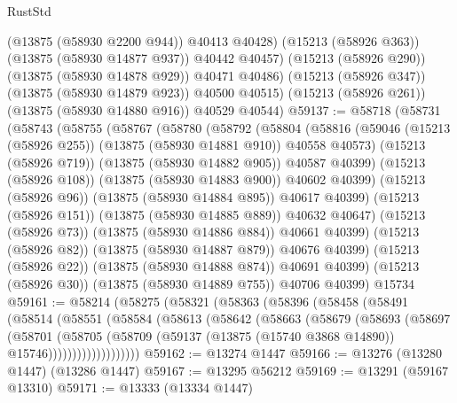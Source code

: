 \begin{lexlean}{RustStd}
\begin{coremodule}
              (@13875 (@58930 @2200 @944))
              @40413
              @40428)
            (@15213 (@58926 @363))
            (@13875 (@58930 @14877 @937))
            @40442
            @40457)
          (@15213 (@58926 @290))
          (@13875 (@58930 @14878 @929))
          @40471
          @40486)
        (@15213 (@58926 @347))
        (@13875 (@58930 @14879 @923))
        @40500
        @40515)
      (@15213 (@58926 @261))
      (@13875 (@58930 @14880 @916))
      @40529
      @40544)
@59137 := @58718
    (@58731
      (@58743
        (@58755
          (@58767
            (@58780
              (@58792
                (@58804
                  (@58816
                    (@59046 (@15213 (@58926 @255)) (@13875 (@58930 @14881 @910)) @40558 @40573)
                    (@15213 (@58926 @719))
                    (@13875 (@58930 @14882 @905))
                    @40587
                    @40399)
                  (@15213 (@58926 @108))
                  (@13875 (@58930 @14883 @900))
                  @40602
                  @40399)
                (@15213 (@58926 @96))
                (@13875 (@58930 @14884 @895))
                @40617
                @40399)
              (@15213 (@58926 @151))
              (@13875 (@58930 @14885 @889))
              @40632
              @40647)
            (@15213 (@58926 @73))
            (@13875 (@58930 @14886 @884))
            @40661
            @40399)
          (@15213 (@58926 @82))
          (@13875 (@58930 @14887 @879))
          @40676
          @40399)
        (@15213 (@58926 @22))
        (@13875 (@58930 @14888 @874))
        @40691
        @40399)
      (@15213 (@58926 @30))
      (@13875 (@58930 @14889 @755))
      @40706
      @40399)
    @15734
@59161 := @58214
    (@58275
      (@58321
        (@58363
          (@58396
            (@58458
              (@58491
                (@58514
                  (@58551
                    (@58584
                      (@58613
                        (@58642
                          (@58663
                            (@58679
                              (@58693
                                (@58697
                                  (@58701
                                    (@58705
                                      (@58709
                                        (@59137
                                          (@13875 (@15740 @3868 @14890))
                                          @15746)))))))))))))))))))
@59162 := @13274 @1447
@59166 := @13276 (@13280 @1447) (@13286 @1447)
@59167 := @13295 @56212
@59169 := @13291 (@59167 @13310)
@59171 := @13333 (@13334 @1447)

\end{coremodule}
\end{lexlean}
